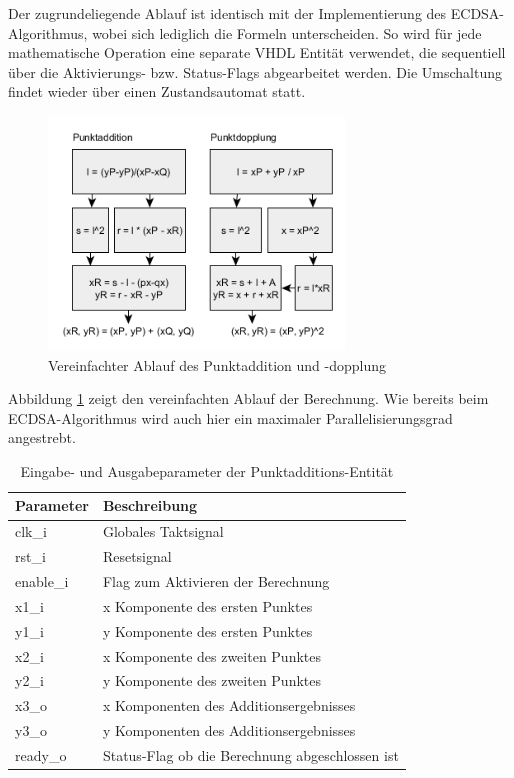 Der zugrundeliegende Ablauf ist identisch mit der Implementierung des ECDSA-Algorithmus, wobei sich lediglich die Formeln unterscheiden. So wird für jede mathematische Operation eine separate VHDL Entität verwendet, die sequentiell über die Aktivierungs- bzw. Status-Flags abgearbeitet werden. Die Umschaltung findet wieder über einen Zustandsautomat statt.

\begin{figure}[thb]
	\centering
	\includegraphics[width=0.7\textwidth]{bilder/vhdl_pa_pd.png}
	\caption{Vereinfachter Ablauf des Punktaddition und -dopplung}
	\label{fig:vhdl-impl-pa-pd}
\end{figure}

Abbildung \ref{fig:vhdl-impl-pa-pd} zeigt den vereinfachten Ablauf der Berechnung. Wie bereits beim ECDSA-Algorithmus wird auch hier ein maximaler Parallelisierungsgrad angestrebt. \\

\begin{table} [h]
	\centering 
	\begin{tabular}{ | p{3cm} | p{12cm} | }
		\hline
		\textbf{Parameter} & \textbf{Beschreibung}\\
		\hline
		clk\_i & Globales Taktsignal \\
		\hline
		rst\_i & Resetsignal \\
		\hline
		enable\_i & Flag zum Aktivieren der Berechnung \\
		\hline
		x1\_i & x Komponente des ersten Punktes \\
		\hline
		y1\_i & y Komponente des ersten Punktes \\
		\hline
		x2\_i & x Komponente des zweiten Punktes \\
		\hline
		y2\_i & y Komponente des zweiten Punktes \\
		\hline
		x3\_o & x Komponenten des Additionsergebnisses \\
		\hline
		y3\_o & y Komponenten des Additionsergebnisses \\
		\hline
		ready\_o & Status-Flag ob die Berechnung abgeschlossen ist  \\
		\hline
		\hline
	\end{tabular}
	\caption{Eingabe- und Ausgabeparameter der Punktadditions-Entität}
	\label{tab:vhdl-impl-eccadd-param}
\end{table}

